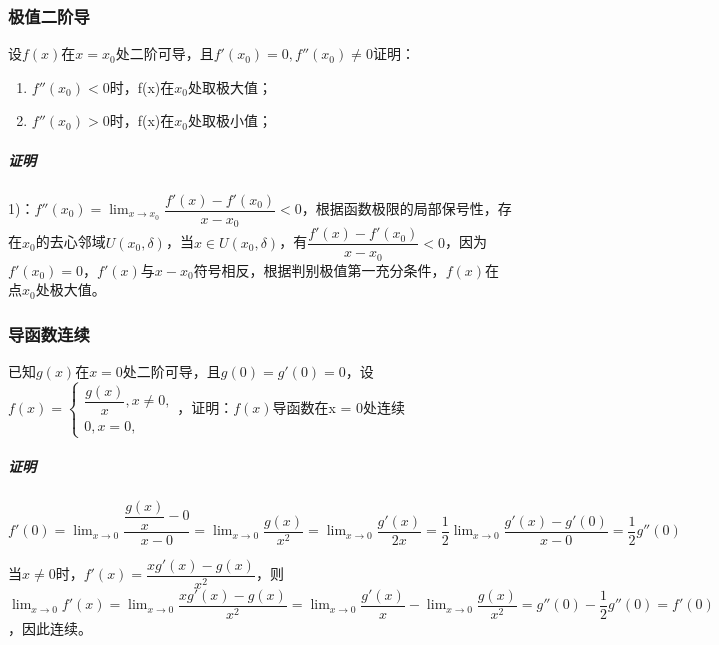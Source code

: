 \subsubsection{极值二阶导}
设\(f(x)\)在\(x = x_0\)处二阶可导，且\(f'(x_0) = 0, f''(x_0) \neq 0\)证明：
\begin{enumerate}
    \item \(f''(x_0) < 0\)时，f(x)在\(x_0\)处取极大值；
    \item \(f''(x_0) > 0\)时，f(x)在\(x_0\)处取极小值；
\end{enumerate}
\subparagraph{证明}
1)：\(f''(x_0) = \displaystyle \lim_{x \to x_0}\dfrac{f'(x) - f'(x_0)}{x - x_0} < 0\)，根据函数极限的局部保号性，存在\(x_0\)的去心邻域\(U(x_0, \delta)\)，当\(x \in U(x_0, \delta)\)，有\(\dfrac{f'(x) - f'(x_0)}{x - x_0} < 0\)，因为\(f'(x_0) = 0\)，\(f'(x)\)与\(x - x_0\)符号相反，根据判别极值第一充分条件，\(f(x)\)在点\(x_0\)处极大值。


\subsubsection{导函数连续}
已知\(g(x)\)在\(x = 0\)处二阶可导，且\(g(0) = g'(0) = 0\)，设\(f(x) = \begin{cases}
\dfrac{g(x)}{x}, x\neq 0, \\ 
0, x = 0,
\end{cases}\)，证明：\(f(x)\)导函数在x = 0处连续
\subparagraph{证明}
\(f'(0) = \displaystyle \lim_{x \to 0}\dfrac{\dfrac{g(x)}{x} - 0}{x - 0} = \lim_{x \to 0}\dfrac{g(x)}{x^2} = \lim_{x \to 0}\dfrac{g'(x)}{2x} = \dfrac{1}{2}\lim_{x \to 0}\dfrac{g'(x) - g'(0)}{x - 0} = \dfrac{1}{2}g''(0)\)

当\(x \neq 0\)时，\(f'(x) = \dfrac{xg'(x) - g(x)}{x^2}\)，则\(\displaystyle\lim_{x \to 0}f'(x) = \lim_{x \to 0}\dfrac{xg'(x) - g(x)}{x^2} = \lim_{x \to 0}\dfrac{g'(x)}{x} - \lim_{x \to 0}\dfrac{g(x)}{x^2} = g''(0) - \dfrac{1}{2}g''(0) = f'(0)\)，因此连续。



